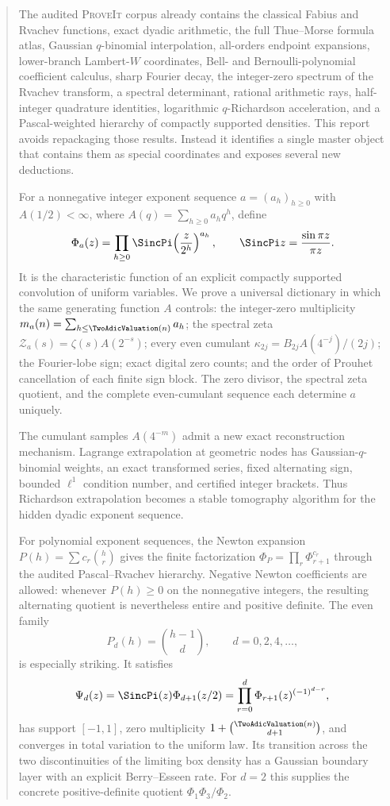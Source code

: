 \documentclass[11pt,oneside]{article}
\numberwithin{equation}{section}
\theoremstyle{definition}
\theoremstyle{remark}
\newcommand{\repo}{\textsc{ProveIt}}
\begin{document}
\begin{abstract}
The audited \repo{} corpus already contains the classical Fabius and Rvachev functions,
exact dyadic arithmetic, the full Thue--Morse formula atlas, Gaussian $q$-binomial
interpolation, all-orders endpoint expansions, lower-branch Lambert-$W$ coordinates,
Bell- and Bernoulli-polynomial coefficient calculus, sharp Fourier decay, the integer-zero
spectrum of the Rvachev transform, a spectral determinant, rational arithmetic rays,
half-integer quadrature identities, logarithmic $q$-Richardson acceleration, and a
Pascal-weighted hierarchy of compactly supported densities.  This report avoids repackaging
those results.  Instead it identifies a single master object that contains them as special
coordinates and exposes several new deductions.

For a nonnegative integer exponent sequence $a=(a_h)_{h\ge0}$ with
$A(1/2)<\infty$, where $A(q)=\sum_{h\ge0}a_hq^h$, define
\[
 \Phi_a(z)=\prod_{h\ge0}\SincPi\!\left(\frac{z}{2^h}\right)^{a_h},
 \qquad \SincPi z=\frac{\sin\pi z}{\pi z}.
\]
It is the characteristic function of an explicit compactly supported convolution of
uniform variables.  We prove a universal dictionary in which the same generating function
$A$ controls: the integer-zero multiplicity
$m_a(n)=\sum_{h\le\TwoAdicValuation(n)}a_h$; the spectral zeta
$\mathcal Z_a(s)=\zeta(s)A(2^{-s})$; every even cumulant
$\kappa_{2j}=B_{2j}A(4^{-j})/(2j)$; the Fourier-lobe sign; exact digital zero counts;
and the order of Prouhet cancellation of each finite sign block.  The zero divisor, the
spectral zeta quotient, and the complete even-cumulant sequence each determine $a$ uniquely.

The cumulant samples $A(4^{-m})$ admit a new exact reconstruction mechanism.  Lagrange
extrapolation at geometric nodes has Gaussian-$q$-binomial weights, an exact transformed
series, fixed alternating sign, bounded $\ell^1$ condition number, and certified integer
brackets.  Thus Richardson extrapolation becomes a stable tomography algorithm for the
hidden dyadic exponent sequence.

For polynomial exponent sequences, the Newton expansion
$P(h)=\sum c_r\binom hr$ gives the finite factorization
$\Phi_P=\prod_r\Phi_{r+1}^{c_r}$ through the audited Pascal--Rvachev hierarchy.  Negative
Newton coefficients are allowed: whenever $P(h)\ge0$ on the nonnegative integers, the
resulting alternating quotient is nevertheless entire and positive definite.  The even
family
\[
 P_d(h)=\binom{h-1}{d},\qquad d=0,2,4,\ldots,
\]
is especially striking.  It satisfies
\[
 \Psi_d(z)=\SincPi(z)\Phi_{d+1}(z/2)
 =\prod_{r=0}^d\Phi_{r+1}(z)^{(-1)^{d-r}},
\]
has support $[-1,1]$, zero multiplicity
$1+\binom{\TwoAdicValuation(n)}{d+1}$, and converges in total variation to the uniform law.  Its
transition across the two discontinuities of the limiting box density has a Gaussian
boundary layer with an explicit Berry--Esseen rate.  For $d=2$ this supplies the concrete
positive-definite quotient $\Phi_1\Phi_3/\Phi_2$.


\end{abstract}
\end{document}
